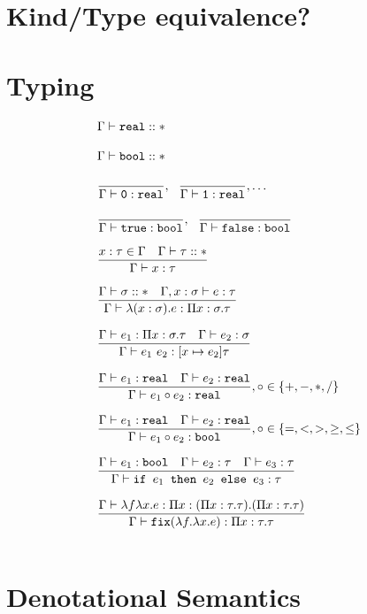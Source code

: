\section{Kind/Type equivalence?}

\section{Typing}
\begin{figure}[H]
\[
\begin{array}{lr}
\Gamma \vdash \texttt{real} :: * \\ \\
\Gamma \vdash \texttt{bool} :: * \\ \\
\dfrac{}{\Gamma \vdash \texttt{0}: \texttt{real}}, \ \ \dfrac{}{\Gamma \vdash \texttt{1}: \texttt{real}}, \ldots \\ \\
\dfrac{}{\Gamma \vdash \texttt{true} : \texttt{bool}}, \ \ \dfrac{}{\Gamma \vdash \texttt{false} : \texttt{bool}} \\  \\
\dfrac{x : \tau \in \Gamma \ \ \ \Gamma \vdash \tau :: *}{\Gamma \vdash x : \tau } \\ \\ 
\dfrac{\Gamma \vdash \sigma :: * \ \ \ \Gamma, x : \sigma \vdash e : \tau}
	{\Gamma \vdash \lambda (x : \sigma).e : \Pi x:\sigma.\tau } \\ \\
\dfrac{\Gamma \vdash e_1: \Pi x:\sigma.\tau \ \ \ \Gamma \vdash e_2 : \sigma}
	{\Gamma \vdash e_1 \ e_2 : [x \mapsto e_2]\tau} \\ \\
\dfrac{\Gamma \vdash e_1 : \texttt{real} \ \ \ \Gamma \vdash e_2 : \texttt{real}}
	{\Gamma \vdash e_1 \circ e_2 : \texttt{real}}
, \circ \in \{+,-,*,/\} \\ \\ 
\dfrac{\Gamma \vdash e_1 : \texttt{real} \ \ \ \Gamma \vdash e_2 : \texttt{real}}
	{\Gamma \vdash e_1 \circ e_2 : \texttt{bool}}
	, \circ \in \{=, <, >, \geq, \leq\} \\ \\ 
\dfrac{\Gamma \vdash e_1 : \texttt{bool} \ \ \ \Gamma \vdash e_2 : \tau \ \ \ \Gamma \vdash e_3 : \tau}
	{\Gamma \vdash \ifelse{e_1}{e_2}{e_3} : \tau} \\ \\ 
\dfrac{\Gamma \vdash \lambda f \lambda x.e : \Pi x:(\Pi x:\tau.\tau).(\Pi x:\tau.\tau)}
	{\Gamma \vdash \texttt{fix}(\lambda f. \lambda x.e) : \Pi x:\tau.\tau} \\ \\ 
\end{array}
\]
\end{figure}

\section{Denotational Semantics}
 
